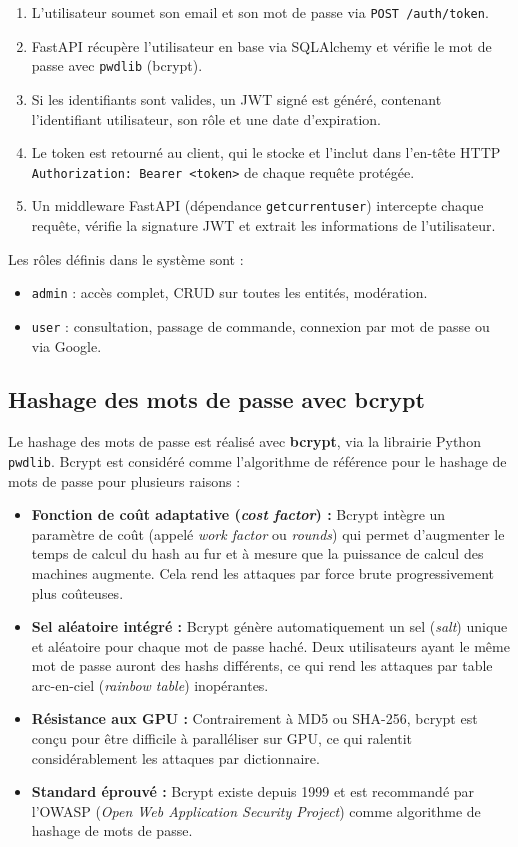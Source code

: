 \documentclass[12pt, a4paper]{report}
\renewcommand{\_}{\origunderscore\allowbreak}
\begin{document}
\begin{enumerate}
    \item L'utilisateur soumet son email et son mot de passe via \texttt{POST /auth/token}.
    \item FastAPI récupère l'utilisateur en base via SQLAlchemy et vérifie le mot de passe avec \texttt{pwdlib} (bcrypt).
    \item Si les identifiants sont valides, un JWT signé est généré, contenant l'identifiant utilisateur, son rôle et une date d'expiration.
    \item Le token est retourné au client, qui le stocke et l'inclut dans l'en-tête HTTP \texttt{Authorization: Bearer <token>} de chaque requête protégée.
    \item Un middleware FastAPI (dépendance \texttt{get\_current\_user}) intercepte chaque requête, vérifie la signature JWT et extrait les informations de l'utilisateur.
\end{enumerate}

\noindent Les rôles définis dans le système sont :
\begin{itemize}
    \item \texttt{admin} : accès complet, CRUD sur toutes les entités, modération.
    \item \texttt{user} : consultation, passage de commande, connexion par mot de passe ou via Google.
\end{itemize}

\subsection{Hashage des mots de passe avec bcrypt}

Le hashage des mots de passe est réalisé avec \textbf{bcrypt}, via la librairie Python \texttt{pwdlib}. Bcrypt est considéré comme l'algorithme de référence pour le hashage de mots de passe pour plusieurs raisons :

\begin{itemize}
    \item \textbf{Fonction de coût adaptative (\textit{cost factor}) :} Bcrypt intègre un paramètre de coût (appelé \textit{work factor} ou \textit{rounds}) qui permet d'augmenter le temps de calcul du hash au fur et à mesure que la puissance de calcul des machines augmente. Cela rend les attaques par force brute progressivement plus coûteuses.
    \item \textbf{Sel aléatoire intégré :} Bcrypt génère automatiquement un sel (\textit{salt}) unique et aléatoire pour chaque mot de passe haché. Deux utilisateurs ayant le même mot de passe auront des hashs différents, ce qui rend les attaques par table arc-en-ciel (\textit{rainbow table}) inopérantes.
    \item \textbf{Résistance aux GPU :} Contrairement à MD5 ou SHA-256, bcrypt est conçu pour être difficile à paralléliser sur GPU, ce qui ralentit considérablement les attaques par dictionnaire.
    \item \textbf{Standard éprouvé :} Bcrypt existe depuis 1999 et est recommandé par l'OWASP (\textit{Open Web Application Security Project}) comme algorithme de hashage de mots de passe.
\end{itemize}
\end{document}
